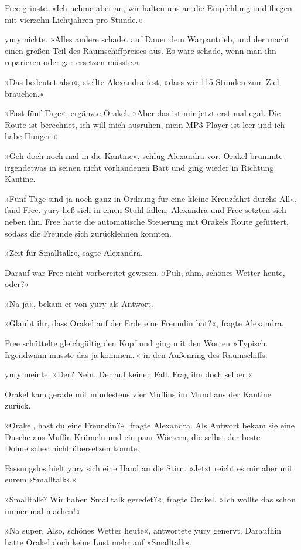 Free grinste. »Ich nehme aber an, wir halten uns an die Empfehlung und fliegen mit vierzehn Lichtjahren pro Stunde.«

yury nickte. »Alles andere schadet auf Dauer dem Warpantrieb, und der macht einen großen Teil des Raumschiffpreises aus. Es wäre schade, wenn man ihn reparieren oder gar ersetzen müsste.«

»Das bedeutet also«, stellte Alexandra fest, »dass wir 115 Stunden zum Ziel brauchen.«

»Fast fünf Tage«, ergänzte Orakel. »Aber das ist mir jetzt erst mal egal. Die Route ist berechnet, ich will mich ausruhen, mein MP3-Player ist leer und ich habe Hunger.«

»Geh doch noch mal in die Kantine«, schlug Alexandra vor. Orakel brummte irgendetwas in seinen nicht vorhandenen Bart und ging wieder in Richtung Kantine.

»Fünf Tage sind ja noch ganz in Ordnung für eine kleine Kreuzfahrt durchs All«, fand Free. yury ließ sich in einen Stuhl fallen; Alexandra und Free setzten sich neben ihn. Free hatte die automatische Steuerung mit Orakels Route gefüttert, sodass die Freunde sich zurücklehnen konnten.

»Zeit für Smalltalk«, sagte Alexandra.

Darauf war Free nicht vorbereitet gewesen. »Puh, ähm, schönes Wetter heute, oder?«

»Na ja«, bekam er von yury als Antwort.

»Glaubt ihr, dass Orakel auf der Erde eine Freundin hat?«, fragte Alexandra.

Free schüttelte gleichgültig den Kopf und ging mit den Worten »Typisch. Irgendwann musste das ja kommen…« in den Außenring des Raumschiffs.

yury meinte: »Der? Nein. Der auf keinen Fall. Frag ihn doch selber.«

Orakel kam gerade mit mindestens vier Muffins im Mund aus der Kantine zurück.

»Orakel, hast du eine Freundin?«, fragte Alexandra. Als Antwort bekam sie eine Dusche aus Muffin-Krümeln und ein paar Wörtern, die selbst der beste Dolmetscher nicht übersetzen konnte.

Fassungslos hielt yury sich eine Hand an die Stirn. »Jetzt reicht es mir aber mit eurem ›Smalltalk‹.«

»Smalltalk? Wir haben Smalltalk geredet?«, fragte Orakel. »Ich wollte das schon immer mal machen!«

»Na super. Also, schönes Wetter heute«, antwortete yury genervt. Daraufhin hatte Orakel doch keine Lust mehr auf »Smalltalk«.

